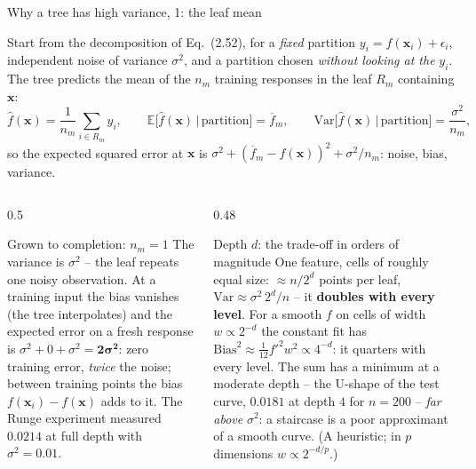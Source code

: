 \documentclass[10pt,aspectratio=169]{beamer}
\begin{document}
\begin{frame}{Why a tree has high variance, 1: the leaf mean}
\footnotesize\setlength{\abovedisplayskip}{3pt}\setlength{\belowdisplayskip}{3pt}
\begin{block}{Start from the decomposition of Eq.~(2.52), for a \emph{fixed} partition}
$y_i=f(\bm{x}_i)+\epsilon_i$, independent noise of variance $\sigma^2$, and a
partition chosen \emph{without looking at the} $y_i$.  The tree predicts the
mean of the $n_m$ training responses in the leaf $R_m$ containing $\bm{x}$:
\[
  \hat f(\bm{x})=\frac1{n_m}\sum_{i\in R_m}y_i,\qquad
  \mathbb{E}\bigl[\hat f(\bm{x})\,\big|\,\text{partition}\bigr]=\overline{f}_m,\qquad
  \mathrm{Var}\bigl[\hat f(\bm{x})\,\big|\,\text{partition}\bigr]=\frac{\sigma^2}{n_m},
\]
so the expected squared error at $\bm{x}$ is
$\sigma^2+(\overline{f}_m-f(\bm{x}))^2+\sigma^2/n_m$: noise, bias, variance.
\end{block}
\begin{columns}[T]
\begin{column}{0.5\textwidth}
\begin{block}{Grown to completion: $n_m=1$}
The variance is $\sigma^2$ -- the leaf repeats one noisy observation.  At a
training input the bias vanishes (the tree interpolates) and the expected
error on a fresh response is $\sigma^2+0+\sigma^2=\mathbf{2\sigma^2}$: zero
training error, \emph{twice} the noise; between training points the bias
$f(\bm{x}_i)-f(\bm{x})$ adds to it.  The Runge experiment measured $0.0214$
at full depth with $\sigma^2=0.01$.
\end{block}
\end{column}
\begin{column}{0.48\textwidth}
\begin{block}{Depth $d$: the trade-off in orders of magnitude}
One feature, cells of roughly equal size: $\approx n/2^d$ points per leaf,
$\mathrm{Var}\approx\sigma^2\,2^d/n$ -- it \textbf{doubles with every
level}.  For a smooth $f$ on cells of width $w\propto2^{-d}$ the constant
fit has $\mathrm{Bias}^2\approx\tfrac1{12}f'^2w^2\propto4^{-d}$: it quarters
with every level.  The sum has a minimum at a moderate depth -- the U-shape
of the test curve, $0.0181$ at depth $4$ for $n=200$ -- \emph{far above}
$\sigma^2$: a staircase is a poor approximant of a smooth curve.  (A
heuristic; in $p$ dimensions $w\propto2^{-d/p}$.)
\end{block}
\end{column}
\end{columns}
\end{frame}
\end{document}
